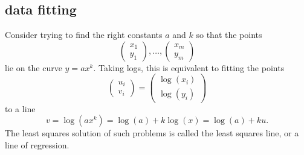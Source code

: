 \documentclass[12pt]{article}
\begin{document}

\subsection{data fitting} %

Consider trying to find the right constants $a$ and $k$ so that the points 
\begin{equation*}
	\begin{pmatrix} x_1 \\ y_1 \end{pmatrix}, \dots, \begin{pmatrix} x_m \\ y_m \end{pmatrix}
\end{equation*}
lie on the curve $y=ax^k$. Taking logs, this is equivalent to fitting the points 
\begin{equation*}
	\begin{pmatrix} u_i \\ v_i \end{pmatrix} = \begin{pmatrix} \log(x_i) \\ \log(y_i) \end{pmatrix}
\end{equation*}
to a line 
\begin{equation*}
	v = \log(ax^k) = \log(a) + k\log(x) = \log(a) + ku.
\end{equation*}
The least squares solution of such problems is called the least squares line, or a line of regression.
\end{document}
